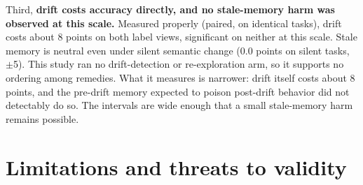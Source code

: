 \documentclass[sigconf, nonacm]{acmart}
\begin{document}
Third, \textbf{drift costs accuracy directly, and no stale-memory harm was observed at this scale.} Measured properly (paired, on identical tasks), drift costs about 8 points on both label views, significant on neither at this scale. Stale memory is neutral even under silent semantic change (0.0 points on silent tasks, $\pm$5). This study ran no drift-detection or re-exploration arm, so it supports no ordering among remedies. What it measures is narrower: drift itself costs about 8 points, and the pre-drift memory expected to poison post-drift behavior did not detectably do so. The intervals are wide enough that a small stale-memory harm remains possible.

\section{Limitations and threats to validity}
\end{document}
